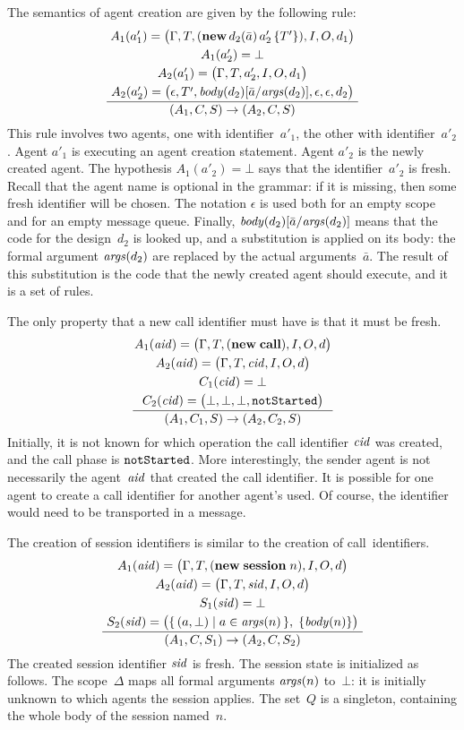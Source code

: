 \documentclass[a4paper,12pt,oneside,fleqn]{book} %
\newcommand{\on}[2]{\genfrac{}{}{0pt}{0}{\strut#1}{\strut#2}}
\begin{document}
{The semantics of agent creation are given by the following rule:
\begin{align}
\frac
  {\on{A_1(a'_1)=\bigl(\Gamma,T,({\bf new}\,d_2(\bar{a})\,a'_2\,\{T'\}),I,O,d_1\bigr)}
  {\on{A_1(a'_2)=\bot}
  {\on{A_2(a'_1)=\bigl(\Gamma,T,a'_2,I,O,d_1\bigr)}
  {A_2(a'_2)=\bigl(\epsilon,T',{\it body}(d_2)[\bar{a}/{\it
  args}(d_2)],\epsilon,\epsilon, d_2\bigr)}}}}
  {(A_1,C,S)\to(A_2,C,S)}
\label{eq:opsem-newagent}
\end{align}
This rule involves two agents, one with identifier~$a'_1$, the other with
identifier~$a'_2$. Agent $a'_1$ is executing an agent creation statement.
Agent $a'_2$ is the newly created agent. The hypothesis $A_1(a'_2)=\bot$
says that the identifier~$a'_2$ is fresh. Recall that the agent name is
optional in the grammar: if it is missing, then some fresh identifier will
be chosen.  The notation $\epsilon$ is used both for an empty scope and for
an empty message queue. Finally, ${\it body}(d_2)[\bar{a}/{\it args}(d_2)]$
means that the code for the design~$d_2$ is looked up, and a substitution is
applied on its body: the formal argument ${\it args}(d_2)$ are replaced by
the actual arguments~$\bar a$. The result of this substitution is the code
that the newly created agent should execute, and it is a set of rules.

The only property that a new call identifier must have is that it must be
fresh.
\begin{align}
\frac
  {\on{A_1({\it aid})=\bigl(\Gamma,T,({\bf new}\;{\bf call}),I,O,d\bigr)}
  {\on{A_2({\it aid})=\bigl(\Gamma,T,{\it cid},I,O,d\bigr)}
  {\on{C_1({\it cid})=\bot}
      {C_2({\it cid})=\bigl(\bot,\bot,\bot,{\tt notStarted}\bigr)}}}}
  {(A_1,C_1,S)\to(A_2,C_2,S)}
\end{align}
Initially, it is not known for which operation the call identifier $\it
cid$ was created, and the call phase is $\tt notStarted$. More
interestingly, the sender agent is not necessarily the agent~$\it aid$ that
created the call identifier. It is possible for one agent to create a call
identifier for another agent's used. Of course, the identifier would need
to be transported in a message.

The creation of session identifiers is similar to the creation of
call~identifiers.
\begin{align}
\frac
  {\on{A_1({\it aid})=\bigl(\Gamma,T,({\bf new}\;{\bf session}\;n),I,O,d\bigr)}
  {\on{A_2({\it aid})=\bigl(\Gamma,T,{\it sid},I,O,d\bigr)}
  {\on{S_1({\it sid})=\bot}
      {S_2({\it sid})=\bigl(\{\,(a,\bot)\mid a\in{\it args}(n)\,\},\;
        \{{\it body}(n)\}\bigr)}}}}
  {(A_1,C,S_1)\to(A_2,C,S_2)}
\end{align}
The created session identifier $\it sid$ is fresh. The session state is
initialized as follows. The scope~$\Delta$ maps all formal arguments ${\it
args}(n)$ to~$\bot$: it is initially unknown to which agents the session
applies. The set~$Q$ is a singleton, containing the whole body of the
session named~$n$.

}
\end{document}
